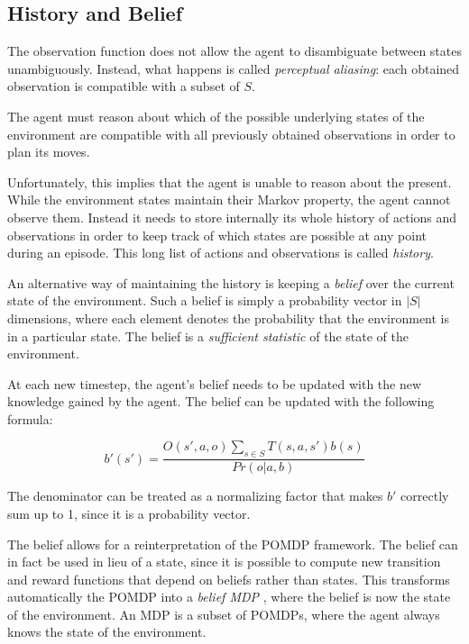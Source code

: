 \subsection{History and Belief}

The observation function does not allow the agent to disambiguate between states unambiguously.
Instead, what happens is called \textit{perceptual aliasing}: each obtained observation is
compatible with a subset of $S$.

The agent must reason about which of the possible underlying states of the environment are
compatible with all previously obtained observations in order to plan its moves.

Unfortunately, this implies that the agent is unable to reason about the present. While the
environment states maintain their Markov property, the agent cannot observe them. Instead it needs
to store internally its whole history of actions and observations in order to keep track of which
states are possible at any point during an episode. This long list of actions and observations is
called \textit{history}.

An alternative way of maintaining the history is keeping a \textit{belief} over the current state of
the environment. Such a belief is simply a probability vector in $|S|$ dimensions, where each
element denotes the probability that the environment is in a particular state. The belief is a
\textit{sufficient statistic} of the state of the environment.

At each new timestep, the agent's belief needs to be updated with the new knowledge gained by the
agent. The belief can be updated with the following formula:

\begin{equation}
 b'(s') = \frac{O(s', a, o)\sum_{s\in S}T(s,a,s')b(s)}{Pr(o|a,b)}
\end{equation}

The denominator can be treated as a normalizing factor that makes $b'$ correctly sum up to 1, since
it is a probability vector.

The belief allows for a reinterpretation of the POMDP framework. The belief can in fact be used in
lieu of a state, since it is possible to compute new transition and reward functions that depend on
beliefs rather than states. This transforms automatically the POMDP into a \textit{belief MDP}
\cite{cit:pomdp}, where the belief is now the state of the environment. An MDP
\cite{cit:suttonbarto} is a subset of POMDPs, where the agent always knows the state of the
environment.

